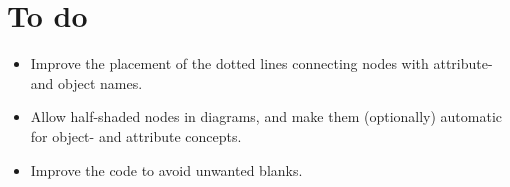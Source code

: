 \documentclass[12pt]{article}
\begin{document}
\section{To do}
\begin{itemize}
\item Improve the placement of the dotted lines connecting nodes with
  attribute- and object names.
\item Allow half-shaded nodes in diagrams, and make them
  (optionally) automatic for object- and attribute concepts.
\item Improve the code to avoid unwanted blanks.
\end{itemize}
\end{document}
